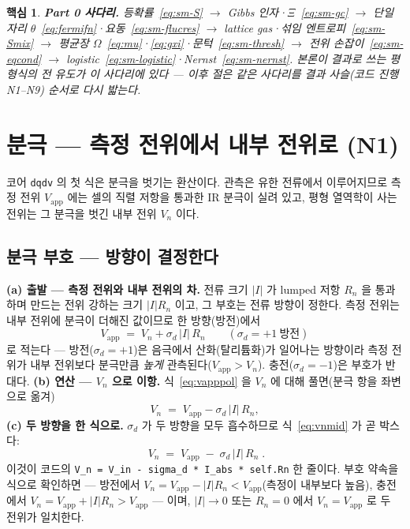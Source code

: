 \documentclass[11pt,a4paper]{article}
\newtheorem*{keybox}{핵심}
\newcommand{\app}{\mathrm{app}}
\newcommand{\code}[1]{\texttt{#1}}
\begin{document}
\begin{keybox}
\textbf{Part 0 사다리.} 등확률~\eqref{eq:sm-S} $\to$ Gibbs 인자·$\Xi$~\eqref{eq:sm-gc} $\to$ 단일 자리
$\theta$~\eqref{eq:fermifn}·요동~\eqref{eq:sm-flucres} $\to$ lattice gas·섞임 엔트로피~\eqref{eq:sm-Smix}
$\to$ 평균장 $\Omega$~\eqref{eq:mu}·\eqref{eq:gxi}·문턱~\eqref{eq:sm-thresh} $\to$ 전위
손잡이~\eqref{eq:sm-eqcond} $\to$ logistic~\eqref{eq:sm-logistic}·Nernst~\eqref{eq:sm-nernst}. 본론이 결과로
쓰는 평형식의 전 유도가 이 사다리에 있다 --- 이후 절은 같은 사다리를 결과 사슬(코드 진행 N1--N9) 순서로
다시 밟는다.
\end{keybox}

\section{분극 — 측정 전위에서 내부 전위로 (N1)}\label{sec:pol}
코어 \code{dqdv} 의 첫 식은 분극을 벗기는 환산이다. 관측은 유한 전류에서 이루어지므로 측정 전위 $V_\app$ 에는 셀의
직렬 저항을 통과한 IR 분극이 실려 있고, 평형 열역학이 사는 전위는 그 분극을 벗긴 내부 전위 $V_n$ 이다.

\subsection{분극 부호 — 방향이 결정한다}
\textbf{(a) 출발 — 측정 전위와 내부 전위의 차.} 전류 크기 $|I|$ 가 lumped 저항 $R_n$ 을 통과하며 만드는 전위 강하는
크기 $|I|R_n$ 이고, 그 부호는 전류 방향이 정한다. 측정 전위는 내부 전위에 분극이 더해진 값이므로 한 방향(방전)에서
\begin{equation}
V_\app\;=\;V_n+\sigma_d\,|I|\,R_n
\qquad(\sigma_d=+1\ \text{방전})
\label{eq:vapppol}
\end{equation}
로 적는다 — 방전($\sigma_d=+1$)은 음극에서 산화(탈리튬화)가 일어나는 방향이라 측정 전위가 내부 전위보다 분극만큼
\emph{높게} 관측된다($V_\app>V_n$). 충전($\sigma_d=-1$)은 부호가 반대다. \textbf{(b) 연산 — $V_n$ 으로 이항.}
식~\eqref{eq:vapppol} 을 $V_n$ 에 대해 풀면(분극 항을 좌변으로 옮겨)
\begin{equation}
V_n\;=\;V_\app-\sigma_d\,|I|\,R_n,
\label{eq:vnmid}
\end{equation}
\textbf{(c) 두 방향을 한 식으로.} $\sigma_d$ 가 두 방향을 모두 흡수하므로 식~\eqref{eq:vnmid} 가 곧 박스다:
\begin{equation}
\boxed{\;V_n\;=\;V_\app\;-\;\sigma_d\,|I|\,R_n\;.}
\label{eq:vn}
\end{equation}
이것이 코드의 \code{V\_n = V\_in - sigma\_d * I\_abs * self.Rn} 한 줄이다. 부호 약속을 식으로 확인하면 —
방전에서 $V_n=V_\app-|I|R_n<V_\app$(측정이 내부보다 높음), 충전에서 $V_n=V_\app+|I|R_n>V_\app$ — 이며,
$|I|\to0$ 또는 $R_n=0$ 에서 $V_n=V_\app$ 로 두 전위가 일치한다.
\end{document}
